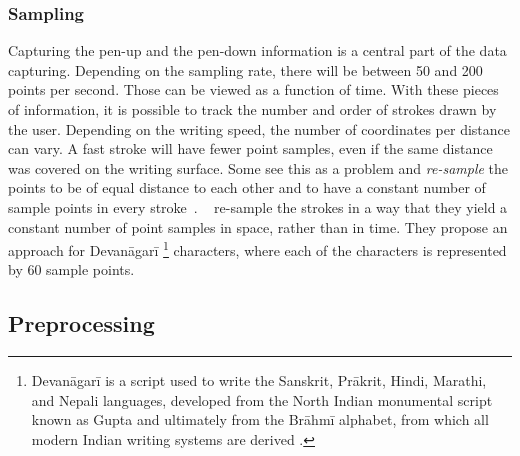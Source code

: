 
\subsubsection{Sampling}
\label{sec:sampling}

Capturing the pen-up and the pen-down information is a central part 
of the data capturing. 
Depending on the sampling rate, there will be between 50 and 200 points per 
second. Those can be viewed as a function of time.
With these pieces of information, it is possible to track the number and order
of strokes drawn by the user. Depending on the writing speed, the number of 
coordinates per distance can vary. A fast stroke will have fewer point samples,
even if the same distance was covered on the writing surface.
Some see this as a problem and \emph{re-sample} the points to be of equal 
distance to each other and to have a constant number of sample points in every 
stroke~.
~\citeyear{Joshi2005} re-sample the strokes in a way that they yield a constant 
number of point samples in space, rather than in time. They propose an approach 
for Devanāgarī
\footnote 
{
Devanāgarī is a script used to write the Sanskrit, Prākrit, Hindi, Marathi, 
and Nepali languages, developed from the North Indian monumental script known 
as Gupta and ultimately from the Brāhmī alphabet, from which all modern Indian 
writing systems are derived \cite{EncyclopediaBritannicaDevanagari}.
} 
characters, where each of the characters is represented by 60 sample points.

\subsection{Preprocessing}
\label{sec:preprocessing}


